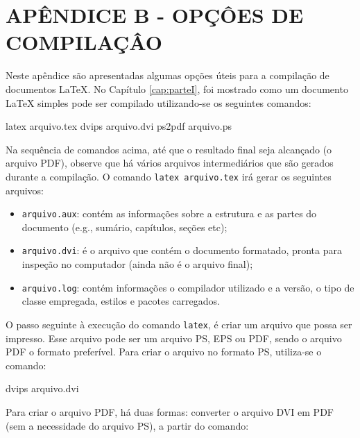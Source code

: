\hypertarget{estilo:apendice1}{} %

\renewcommand{\thechapter}{}%

\chapter{APÊNDICE B - OPÇÔES DE COMPILAÇÂO} %
\label{apendiceB} %

\renewcommand{\thechapter}{B} %

Neste apêndice são apresentadas algumas opções úteis para a compilação de documentos \LaTeX{}. No Capítulo \ref{cap:parteI}, foi mostrado como um documento \LaTeX{} simples pode ser compilado utilizando-se os seguintes comandos:

\begin{meucomando}
latex arquivo.tex 
dvips arquivo.dvi
ps2pdf arquivo.ps
\end{meucomando}

Na sequência de comandos acima, até que o resultado final seja alcançado (o arquivo PDF), observe que há vários arquivos intermediários que são gerados durante a compilação. O comando {\tt latex arquivo.tex} irá gerar os seguintes arquivos:

\begin{itemize}
  \item {\tt arquivo.aux}: contém as informações sobre a estrutura e as partes do documento (e.g., sumário, capítulos, seções etc);
  \item {\tt arquivo.dvi}: é o arquivo que contém o documento formatado, pronta para inspeção no computador (ainda não é o arquivo final);
  \item {\tt arquivo.log}: contém informações o compilador utilizado e a versão, o tipo de classe empregada, estilos e pacotes carregados.
\end{itemize}

O passo seguinte à execução do comando {\tt latex}, é criar um arquivo que possa ser impresso. Esse arquivo pode ser um arquivo PS, EPS ou PDF, sendo o arquivo PDF o formato preferível. Para criar o arquivo no formato PS, utiliza-se o comando:

\begin{meucomando}
dvips arquivo.dvi 
\end{meucomando}

Para criar o arquivo PDF, há duas formas: converter o arquivo DVI em PDF (sem a necessidade do arquivo PS), a partir do comando: 

